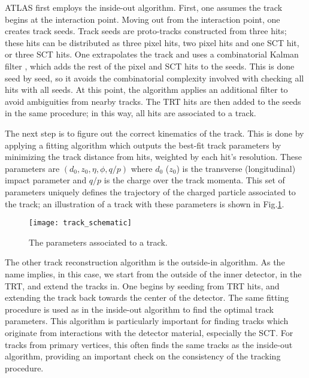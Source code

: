ATLAS first employs the inside-out algorithm.
First, one assumes the track begins at the interaction point.
Moving out from the interaction point, one creates track seeds.
Track seeds are proto-tracks constructed from three hits; these hits can be distributed as three pixel hits, two pixel hits and one SCT hit, or three SCT hits.
One extrapolates the track and uses a combinatorial Kalman filter , which adds the rest of the pixel and SCT hits to the seeds.
This is done seed by seed, so it avoids the combinatorial complexity involved with checking all hits with all seeds.
At this point, the algorithm applies an additional filter to avoid ambiguities from nearby tracks.
The TRT hits are then added to the seeds in the same procedure; in this way, all hits are associated to a track.

The next step is to figure out the correct kinematics of the track.
This is done by applying a fitting algorithm which outputs the best-fit track parameters by minimizing the track distance from hits, weighted by each hit's resolution.
These parameters are $(d_0, z_0, \eta, \phi, q/p)$ where $d_0$ ($z_0$) is the transverse (longitudinal) impact parameter and $q/p$ is the charge over the track momenta.
This set of parameters uniquely defines the trajectory of the charged particle associated to the track; an illustration of a track with these parameters is shown in Fig.\ref{fig:track_schematic}.

\begin{figure}
\caption{The parameters associated to a track.}
\label{fig:track_schematic}
\texttt{[image: track\_schematic]}
\end{figure}

The other track reconstruction algorithm is the outside-in algorithm.
As the name implies, in this case, we start from the outside of the inner detector, in the TRT, and extend the tracks in.
One begins by seeding from TRT hits, and extending the track back towards the center of the detector.
The same fitting procedure is used as in the inside-out algorithm to find the optimal track parameters.
This algorithm is particularly important for finding tracks which originate from interactions with the detector material, especially the SCT.
For tracks from primary vertices, this often finds the same tracks as the inside-out algorithm, providing an important check on the consistency of the tracking procedure.

